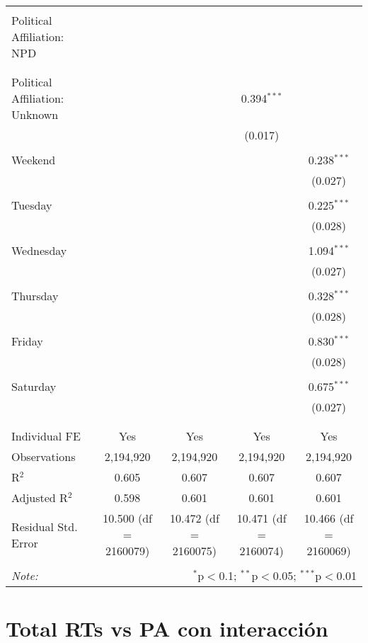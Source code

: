 \documentclass[
]{article}
\begin{document}
\begin{table}[!htbp]
{\begin{tabular}{@{\extracolsep{5pt}}lcccc}
  & & & & \\ 
 Political Affiliation: NPD &  &  &  &  \\ 
  &  &  &  &  \\ 
  & & & & \\ 
 Political Affiliation: Unknown &  &  & 0.394$^{***}$ &  \\ 
  &  &  & (0.017) &  \\ 
  & & & & \\ 
 Weekend &  &  &  & 0.238$^{***}$ \\ 
  &  &  &  & (0.027) \\ 
  & & & & \\ 
 Tuesday &  &  &  & 0.225$^{***}$ \\ 
  &  &  &  & (0.028) \\ 
  & & & & \\ 
 Wednesday &  &  &  & 1.094$^{***}$ \\ 
  &  &  &  & (0.027) \\ 
  & & & & \\ 
 Thursday &  &  &  & 0.328$^{***}$ \\ 
  &  &  &  & (0.028) \\ 
  & & & & \\ 
 Friday &  &  &  & 0.830$^{***}$ \\ 
  &  &  &  & (0.028) \\ 
  & & & & \\ 
 Saturday &  &  &  & 0.675$^{***}$ \\ 
  &  &  &  & (0.027) \\ 
  & & & & \\ 
\hline \\[-1.8ex] 
Individual FE & Yes & Yes & Yes & Yes \\ 
Observations & 2,194,920 & 2,194,920 & 2,194,920 & 2,194,920 \\ 
R$^{2}$ & 0.605 & 0.607 & 0.607 & 0.607 \\ 
Adjusted R$^{2}$ & 0.598 & 0.601 & 0.601 & 0.601 \\ 
Residual Std. Error & 10.500 (df = 2160079) & 10.472 (df = 2160075) & 10.471 (df = 2160074) & 10.466 (df = 2160069) \\ 
\hline 
\hline \\[-1.8ex] 
\textit{Note:}  & \multicolumn{4}{r}{$^{*}$p$<$0.1; $^{**}$p$<$0.05; $^{***}$p$<$0.01} \\ 
\end{tabular}
} 
\end{table} 
\newpage
\section{Total RTs vs PA con interacción}
\end{document}
